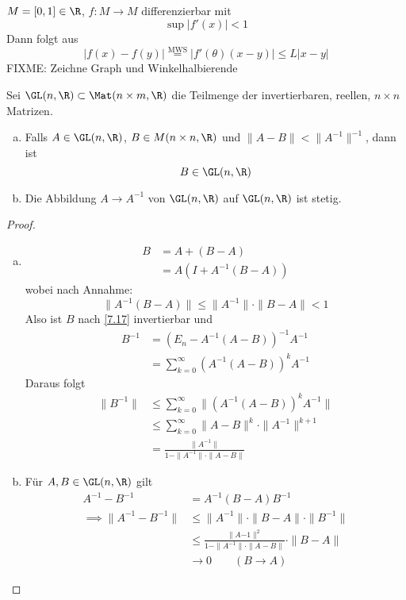 \documentclass[a4paper,10pt]{scrartcl}
\begin{document}
\begin{ex*}
$M=[0,1]\in \R$, $f:M\to M$ differenzierbar mit
\[
\sup |f'(x)| <1
\]
Dann folgt aus
\[
|f(x)-f(y)| \stackrel{\text{MWS}}= |f'(\theta)(x-y)| \le L|x-y|
\]
FIXME: Zeichne Graph und Winkelhalbierende

\end{ex*}


\begin{st}
\label{14.2}
Sei $\GL(n,\R)\subset \Mat(n\times m,\R)$ die Teilmenge der invertierbaren, reellen, $n\times n$ Matrizen.
\begin{enumerate}[a)]
\item Falls $A\in \GL(n,\R)$, $B\in M(n\times n,\R)$ und $\|A-B\|<\|A^{-1}\|^{-1}$, dann ist
\[
	B\in \GL(n,\R)
\]
\item Die Abbildung $A\to A^{-1}$ von $\GL(n,\R)$ auf $\GL(n,\R)$ ist stetig.
\end{enumerate}
\begin{proof}
\begin{enumerate}[a)]
\item
\begin{align*}
B &= A+(B-A)\\
&= A(I + A^{-1}(B-A))
\end{align*}
wobei nach Annahme:
\[
\|A^{-1}(B-A)\| \le \|A^{-1}\|\cdot \|B-A\|<1
\]
Also ist $B$ nach \ref{7.17} invertierbar und
\begin{align*}
B^{-1}&= (E_n-A^{-1}(A-B))^{-1}A^{-1}\\
&=\sum_{k=0}^\infty (A^{-1}(A-B))^k A^{-1}
\end{align*}
Daraus folgt
\begin{align*}
\|B^{-1}\| &\le \sum_{k=0}^\infty \| (A^{-1}(A-B))^{k}A^{-1}\|\\
&\le \sum_{k=0}^\infty \|A-B\|^k\cdot \|A^{-1}\|^{k+1}\\
&= \frac {\|A^{-1}\|}{1-\|A^{-1}\|\cdot \|A-B\|}
\end{align*}

\item
Für $A,B\in \GL(n,\R)$ gilt
\begin{align*}
A^{-1}-B^{-1} &= A^{-1}(B-A)B^{-1}\\
\implies \|A^{-1}-B^{-1}\| &\le\|A^{-1}\|\cdot\|B-A\|\cdot \|B^{-1}\|\\
&\le \frac{\|A{-1}\|^2}{1-\|A^{-1}\|\cdot\|A-B\|}\cdot \|B-A\|\\
&\to 0 \qquad (B\to A)
\end{align*}
\end{enumerate}
\end{proof}
\end{st}
\end{document}
